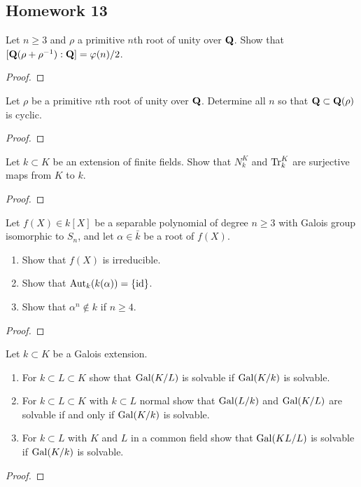 \subsection{Homework 13}
\begin{problem}
Let $n\geq 3$ and $\rho$ a primitive $n$th root of unity over $\mathbf{Q}$. Show
that $[\mathbf{Q}(\rho+\rho^{-1}):\mathbf{Q}]=\varphi(n)/2$.
\end{problem}
\begin{proof}
\end{proof}

\begin{problem}
Let $\rho$ be a primitive $n$th root of unity over $\mathbf{Q}$. Determine all
$n$ so that $\mathbf{Q}\subset\mathbf{Q}(\rho)$ is cyclic.
\end{problem}
\begin{proof}
\end{proof}

\begin{problem}
Let $k\subset K$ be an extension of finite fields. Show that $N_k^K$ and
$\operatorname{Tr}_k^K$ are surjective maps from $K$ to $k$.
\end{problem}
\begin{proof}
\end{proof}

\begin{problem}
Let $f(X)\in k[X]$ be a separable polynomial of degree $n\geq 3$ with
Galois group isomorphic to $S_n$, and let $\alpha\in\bar k$ be a root of
$f(X)$.
\begin{enumerate}[label=(\alph*),noitemsep]
\item Show that $f(X)$ is irreducible.
\item Show that $\operatorname{Aut}_k(k(\alpha))=\{\operatorname{id}\}$.
\item Show that $\alpha^n\notin k$ if $n\geq 4$.
\end{enumerate}
\end{problem}
\begin{proof}
\end{proof}

\begin{problem}
Let $k\subset K$ be a Galois extension.
\begin{enumerate}[label=(\alph*),noitemsep]
\item For $k\subset L\subset K$ show that $\operatorname{Gal}(K/L)$ is solvable if
  $\operatorname{Gal}(K/k)$ is solvable.
\item For $k\subset L\subset K$ with $k\subset L$ normal show that
  $\operatorname{Gal}(L/k)$ and $\operatorname{Gal}(K/L)$ are solvable if and only if $\operatorname{Gal}(K/k)$ is
  solvable.
\item For $k\subset L$ with $K$ and $L$ in a common field show that
  $\operatorname{Gal}(KL/L)$ is solvable if $\operatorname{Gal}(K/k)$ is solvable.
\end{enumerate}
\end{problem}
\begin{proof}
\end{proof}

